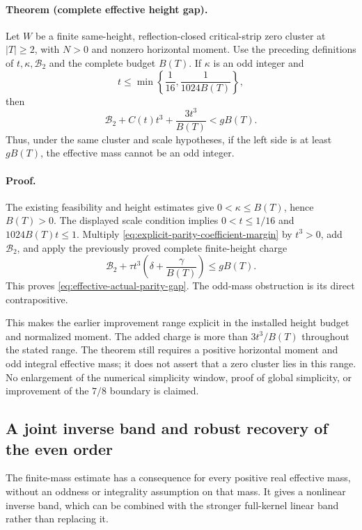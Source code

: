 \paragraph{Theorem (complete effective height gap).}
Let \(W\) be a finite same-height, reflection-closed critical-strip
zero cluster at \(|T|\ge2\), with \(N>0\) and nonzero horizontal
moment.  Use the preceding definitions of \(t,\kappa,\mathcal B_2\)
and the complete budget \(B(T)\).  If \(\kappa\) is an odd integer
and
\[
 t\le\min\left\{\frac1{16},\frac1{1024B(T)}\right\},
\]
then
\begin{equation}
 \mathcal B_2+C(t)t^3+\frac{3t^3}{B(T)}<gB(T).
 \label{eq:effective-actual-parity-gap}
\end{equation}
Thus, under the same cluster and scale hypotheses, if the left
side is at least \(gB(T)\), the effective mass cannot be an odd
integer.

\paragraph{Proof.}
The existing feasibility and height estimates give
\(0<\kappa\le B(T)\), hence \(B(T)>0\).
The displayed scale condition implies \(0<t\le1/16\) and
\(1024B(T)t\le1\).  Multiply
\eqref{eq:explicit-parity-coefficient-margin} by \(t^3>0\),
add \(\mathcal B_2\), and apply the previously proved complete
finite-height charge
\[
 \mathcal B_2+\tau t^3\left(\delta+\frac{\gamma}{B(T)}\right)
 \le gB(T).
\]
This proves \eqref{eq:effective-actual-parity-gap}.
The odd-mass obstruction is its direct contrapositive.

This makes the earlier improvement range explicit in the installed
height budget and normalized moment.  The added charge is more
than \(3t^3/B(T)\) throughout the stated range.  The theorem still
requires a positive horizontal moment and odd integral effective
mass; it does not assert that a zero cluster lies in this range.
No enlargement of the numerical simplicity window, proof of
global simplicity, or improvement of the \(7/8\) boundary is claimed.

\subsection{A joint inverse band and robust recovery of the even order}
\label{sec:joint-inverse-parity}

The finite-mass estimate has a consequence for every positive real
effective mass, without an oddness or integrality assumption on that
mass.  It gives a nonlinear inverse band, which can be combined with
the stronger full-kernel linear band rather than replacing it.

